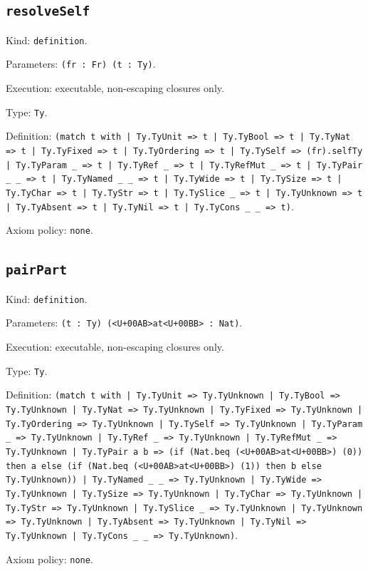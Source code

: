 \documentclass[11pt]{article}
\begin{document}
\subsection*{\texttt{resolveSelf}}
\noindent Kind: \texttt{definition}.\par
\noindent Parameters: \texttt{(fr : Fr) (t : Ty)}.\par
\noindent Execution: executable, non-escaping closures only.\par
\noindent Type: \texttt{Ty}.\par
\noindent Definition: \texttt{(match t with | Ty.TyUnit => t | Ty.TyBool => t | Ty.TyNat => t | Ty.TyFixed => t | Ty.TyOrdering => t | Ty.TySelf => (fr).selfTy | Ty.TyParam \_ => t | Ty.TyRef \_ => t | Ty.TyRefMut \_ => t | Ty.TyPair \_ \_ => t | Ty.TyNamed \_ \_ => t | Ty.TyWide => t | Ty.TySize => t | Ty.TyChar => t | Ty.TyStr => t | Ty.TySlice \_ => t | Ty.TyUnknown => t | Ty.TyAbsent => t | Ty.TyNil => t | Ty.TyCons \_ \_ => t)}.\par
\noindent Axiom policy: \texttt{none}.\par
\subsection*{\texttt{pairPart}}
\noindent Kind: \texttt{definition}.\par
\noindent Parameters: \texttt{(t : Ty) (<U+00AB>at<U+00BB> : Nat)}.\par
\noindent Execution: executable, non-escaping closures only.\par
\noindent Type: \texttt{Ty}.\par
\noindent Definition: \texttt{(match t with | Ty.TyUnit => Ty.TyUnknown | Ty.TyBool => Ty.TyUnknown | Ty.TyNat => Ty.TyUnknown | Ty.TyFixed => Ty.TyUnknown | Ty.TyOrdering => Ty.TyUnknown | Ty.TySelf => Ty.TyUnknown | Ty.TyParam \_ => Ty.TyUnknown | Ty.TyRef \_ => Ty.TyUnknown | Ty.TyRefMut \_ => Ty.TyUnknown | Ty.TyPair a b => (if (Nat.beq (<U+00AB>at<U+00BB>) (0)) then a else (if (Nat.beq (<U+00AB>at<U+00BB>) (1)) then b else Ty.TyUnknown)) | Ty.TyNamed \_ \_ => Ty.TyUnknown | Ty.TyWide => Ty.TyUnknown | Ty.TySize => Ty.TyUnknown | Ty.TyChar => Ty.TyUnknown | Ty.TyStr => Ty.TyUnknown | Ty.TySlice \_ => Ty.TyUnknown | Ty.TyUnknown => Ty.TyUnknown | Ty.TyAbsent => Ty.TyUnknown | Ty.TyNil => Ty.TyUnknown | Ty.TyCons \_ \_ => Ty.TyUnknown)}.\par
\noindent Axiom policy: \texttt{none}.\par
\end{document}
